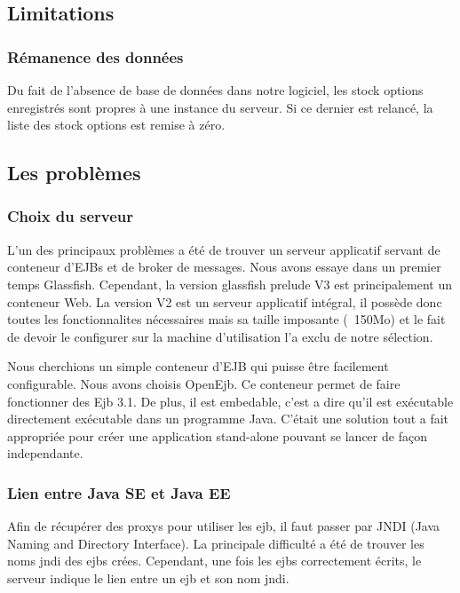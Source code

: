 \subsection{Limitations}
\subsubsection{Rémanence des données}
Du fait de l'absence de base de données dans notre logiciel, les stock options enregistrés sont propres à une instance du serveur. Si ce dernier est relancé, la liste des stock options est remise à zéro.

\subsubsection{}

\subsection{Les problèmes}
\subsubsection{Choix du serveur}
L'un des principaux problèmes a été de trouver un serveur applicatif servant de conteneur d'EJBs et de broker de messages. Nous avons essaye dans un premier temps Glassfish. Cependant, la version glassfish prelude V3 est principalement un conteneur Web. La version V2 est un serveur applicatif intégral, il possède donc toutes les fonctionnalites nécessaires mais sa taille imposante (~150Mo) et le fait de devoir le configurer sur la machine d'utilisation l'a exclu de notre sélection.

Nous cherchions un simple conteneur d'EJB qui puisse être facilement configurable. Nous avons choisis OpenEjb. Ce conteneur permet de faire fonctionner des Ejb 3.1. De plus, il est embedable, c'est a dire qu'il est exécutable directement exécutable dans un programme Java. C'était une solution tout a fait appropriée pour créer une application stand-alone pouvant se lancer de façon independante.
\subsubsection{Lien entre Java SE et Java EE}
Afin de récupérer des proxys pour utiliser les ejb, il faut passer par JNDI (Java Naming and Directory Interface). La principale difficulté a été de trouver les noms jndi des ejbs crées. Cependant, une fois les ejbs correctement écrits, le serveur indique le lien entre un ejb et son nom jndi.